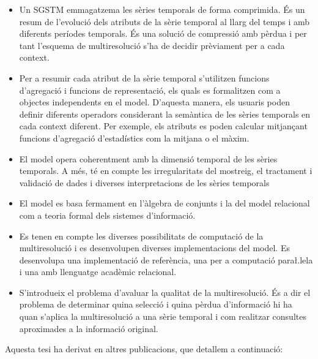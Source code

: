 \begin{itemize}

\item Un \gls{SGSTM} emmagatzema les sèries temporals de forma
  comprimida. És un resum de l'evolució dels atributs de la sèrie
  temporal al llarg del temps i amb diferents períodes temporals. És
  una solució de compressió amb pèrdua i per tant l'esquema de
  multiresolució s'ha de decidir prèviament per a cada context.

\item Per a resumir cada atribut de la sèrie temporal s'utilitzen
  funcions d'agregació i funcions de representació, els quals es
  formalitzen com a objectes independents en el model. D'aquesta
  manera, els usuaris poden definir diferents operadors considerant la
  semàntica de les sèries temporals en cada context diferent.  Per
  exemple, els atributs es poden calcular mitjançant funcions
  d'agregació d'estadístics com la mitjana o el màxim.

\item El model opera coherentment amb la dimensió temporal de les
  sèries temporals. A més, té en compte les irregularitats del
  mostreig, el tractament i validació de dades i diverses
  interpretacions de les sèries temporals

\item El model es basa fermament en l'àlgebra de conjunts i la del
  model relacional com a teoria formal dels sistemes d'informació.

\item Es tenen en compte les diverses possibilitats de computació de
  la multiresolució i es desenvolupen diverses implementacions del
  model. Es desenvolupa una implementació de referència, una per a
  computació para\l.lela i una amb llenguatge acadèmic relacional.


\item S'introdueix el problema d'avaluar la qualitat de la
  multiresolució. És a dir el problema de determinar quina selecció i
  quina pèrdua d'informació hi ha quan s'aplica la multiresolució a
  una sèrie temporal i com realitzar consultes aproximades a la
  informació original.


\end{itemize}






Aquesta tesi ha derivat en altres publicacions, que detallem a continuació:

